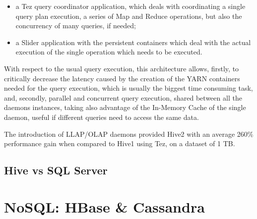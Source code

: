 \begin{itemize}
    \item a Tez query coordinator application, which deals with coordinating a single query plan execution, a series of Map and Reduce operations, but also the concurrency of many queries, if needed;
    \item a Slider application with the persistent containers which deal with the actual execution of the single operation which needs to be executed.
\end{itemize}

With respect to the usual query execution, this architecture allows, firstly, to critically decrease the latency caused by the creation of the YARN containers needed for the query execution, which is usually the biggest time consuming task, and, secondly, parallel and concurrent query execution, shared between all the daemons instances, taking also advantage of the In-Memory Cache of the single daemon, useful if different queries need to access the same data.

The introduction of LLAP/OLAP daemons provided Hive2 with an average 260\% performance gain when compared to Hive1 using Tez, on a dataset of 1 TB.


\subsection{Hive vs SQL Server}


\section{NoSQL: HBase \& Cassandra}

